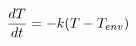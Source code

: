 \documentclass[preview]{standalone}
\begin{document}
\begin{align*}
\special{dvisvgm:raw <g id='unique000'>}\frac{dT}{dt} = -k (T - T_{env})\special{dvisvgm:raw </g>}
\end{align*}
\end{document}
